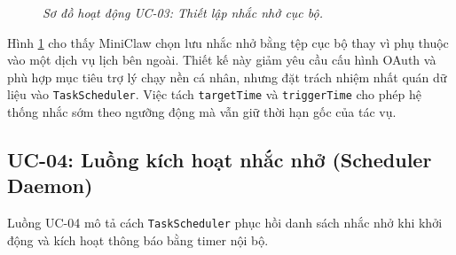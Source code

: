 \begin{figure}[p]
{
  }
  \caption{\emph{Sơ đồ hoạt động UC-03: Thiết lập nhắc nhở cục bộ.}}
  \label{fig:activity-uc03}
\end{figure}
\clearpage

Hình \ref{fig:activity-uc03} cho thấy MiniClaw chọn lưu nhắc nhở bằng tệp cục bộ thay vì phụ thuộc vào một dịch vụ lịch bên ngoài. Thiết kế này giảm yêu cầu cấu hình OAuth và phù hợp mục tiêu trợ lý chạy nền cá nhân, nhưng đặt trách nhiệm nhất quán dữ liệu vào \texttt{TaskScheduler}. Việc tách \texttt{targetTime} và \texttt{triggerTime} cho phép hệ thống nhắc sớm theo ngưỡng động mà vẫn giữ thời hạn gốc của tác vụ.

\subsection{UC-04: Luồng kích hoạt nhắc nhở (Scheduler Daemon)}
Luồng UC-04 mô tả cách \texttt{TaskScheduler} phục hồi danh sách nhắc nhở khi khởi động và kích hoạt thông báo bằng timer nội bộ.

